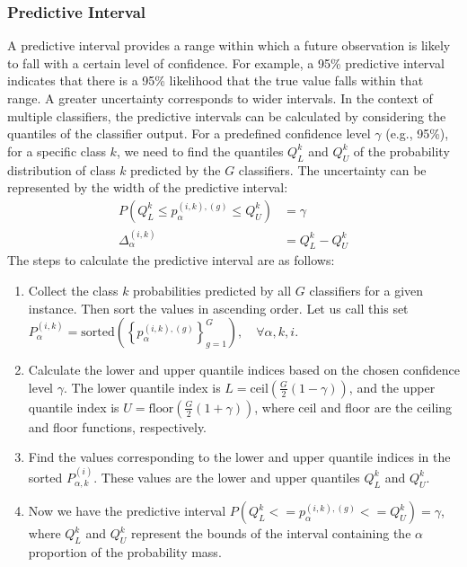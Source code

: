\documentclass[default]{bst/sn-jnl_mine}%
\begin{document}
\subsubsection{Predictive Interval}
A predictive interval provides a range within which a future observation is likely to fall with a certain level of confidence. For example, a 95\% predictive interval indicates that there is a 95\% likelihood that the true value falls within that range. A greater uncertainty corresponds to wider intervals. In the context of multiple classifiers, the predictive intervals can be calculated by considering the quantiles of the classifier output. For a predefined confidence level $\gamma $ (e.g., 95\%), for a specific class $k $, we need to find the quantiles $Q_{L}^{k} $ and $Q_{U}^{k} $ of the probability distribution of class $k $ predicted by the $G $ classifiers. The uncertainty can be represented by the width of the predictive interval:
\begin{align}
    P\left(Q_L^{k} \leq p_{\alpha}^{(i,k),(g)} \leq Q_U^{k}\right) & = \gamma
    \\
    \Delta_{\alpha}^{(i,k)} & = Q_L^{k} - Q_U^{k}
    \label{eq:crowd.Eq.uncertainty}
\end{align}
The steps to calculate the predictive interval are as follows:
\begin{enumerate}
    \item Collect the class $k $ probabilities predicted by all $G$ classifiers for a given instance. Then sort the values in ascending order. Let us call this set $P_{\alpha}^{(i,k)}=\mathrm{sorted}\left({\left\{p_{\alpha}^{(i,k),(g)}\right\}}_{g=1}^G\right),\quad\forall \alpha,k,i $.
    \item Calculate the lower and upper quantile indices based on the chosen confidence level $\gamma $. The lower quantile index is $L=\mathrm{ceil}\left(\frac{G}{2}\left(1-\gamma\right)\right) $, and the upper quantile index is $U=\mathrm{floor}\left(\frac{G}{2} (1+\gamma)\right) $, where ceil and floor are the ceiling and floor functions, respectively.
    \item Find the values corresponding to the lower and upper quantile indices in the sorted $P_{\alpha,k}^{(i)} $. These values are the lower and upper quantiles $Q_L^{k} $ and $Q_U^{k} $.
    \item Now we have the predictive interval $P\left(Q_L^{k}<=p_{\alpha}^{(i,k),(g)}<=Q_U^{k}\right)=\gamma $, where $Q_L^{k} $ and $Q_U^{k} $ represent the bounds of the interval containing the $\alpha$ proportion of the probability mass.
\end{enumerate}
\end{document}
